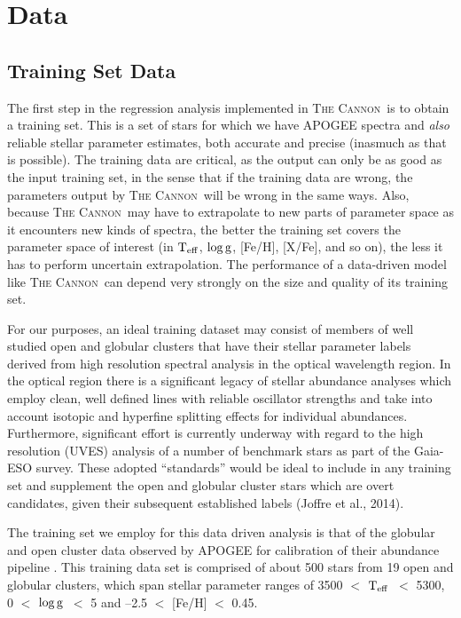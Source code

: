 \documentclass[12pt, preprint]{aastex}
\newcommand{\teff}{\mbox{$\rm T_{eff}$}}
\newcommand{\logg}{\mbox{$\rm \log g$}}
\newcommand{\tc}{\textsc{The Cannon}}
\begin{document}
\break 

\section{Data}

\subsection{Training Set Data}

The first step in the regression analysis implemented in \tc\ is to
obtain a training set.
This is a set of stars for which we have APOGEE spectra and
\emph{also} reliable stellar parameter estimates, both accurate and
precise (inasmuch as that is possible).
The training data are critical, as the output can only be as good as
the input training set, in the sense that if the training data are
wrong, the parameters output by \tc\ will be wrong in the same ways.
Also, because \tc\ may have to extrapolate to new parts of parameter
space as it encounters new kinds of spectra, the better the training
set covers the parameter space of interest (in \teff, \logg, [Fe/H],
[X/Fe], and so on), the less it has to perform uncertain
extrapolation.
The performance of a data-driven model like \tc\ can depend very
strongly on the size and quality of its training set.

For our purposes, an ideal training dataset may consist of members of
well studied open and globular clusters that have their stellar
parameter labels derived from high resolution spectral analysis in the
optical wavelength region.
In the optical region there is a significant legacy of stellar abundance analyses which employ clean, well defined lines with reliable oscillator strengths and take into account isotopic and hyperfine splitting effects for individual abundances. Furthermore, significant effort is currently underway with regard to the high resolution (UVES) analysis of a number of benchmark stars as part of the Gaia-ESO survey. These adopted ``standards'' would be ideal to include in any training set and supplement the open and globular cluster stars which are overt candidates, given their subsequent established labels (Joffre et al., 2014). %

The training set we employ for this data driven analysis is that of the globular and open cluster data observed by APOGEE for calibration of their abundance pipeline \citep{Meszaros2013}. This training data set is comprised of about 500 stars from 19 open and globular clusters, which span stellar parameter ranges of 3500 $<$ \teff\ $<$ 5300, 0 $<$ \logg\ $<$ 5 and --2.5 $<$ [Fe/H] $<$ 0.45. 
\end{document}
